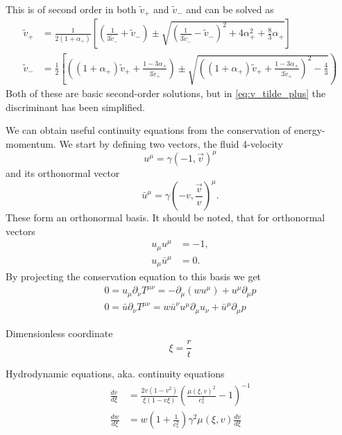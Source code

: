 This is of second order in both $\tilde{v}_+$ and $\tilde{v}_-$ and can be solved as \cite[eq. B.6, B.7]{hindmarsh_gw_pt_2019}
\begin{align}
\tilde{v}_+ &= \frac{1}{2(1+\alpha_+)}\left[ \left(\frac{1}{3\tilde{v}_-}+\tilde{v}_-\right) \pm \sqrt{\left(\frac{1}{3\tilde{v}_-} - \tilde{v}_- \right)^2 + 4\alpha_+^2 + \frac{8}{3} \alpha_+} \right]
\label{eq:v_tilde_plus}
\\
\tilde{v}_- &= \frac{1}{2} \left[ \left( (1+\alpha_+)\tilde{v}_+ + \frac{1-3\alpha_+}{3\tilde{v}_+} \right) \pm \sqrt{\left((1+\alpha_+)\tilde{v}_+ + \frac{1-3\alpha_+}{3\tilde{v}_+} \right)^2 - \frac{4}{3}} \right)
\label{eq:v_tilde_minus}
\end{align}
Both of these are basic second-order solutions, but in \eqref{eq:v_tilde_plus} the discriminant has been simplified.


We can obtain useful continuity equations from the conservation of energy-momentum.
We start by defining two vectors, the fluid 4-velocity
\begin{equation}
u^\mu = \gamma(-1, \overrightarrow{v})^\mu
\end{equation}
and its orthonormal vector
\begin{equation}
\bar{u}^\mu = \gamma(-v, \frac{\overrightarrow{v}}{v})^\mu.
\end{equation}
These form an orthonormal basis.
It should be noted, that for orthonormal vectors
\begin{align}
u_\mu u^\mu &= -1, \\
u_\mu \bar{u}^\mu &= 0.
\end{align}
By projecting the conservation equation to this basis we get
\cite[eq. 7.28-7.29]{lecture_notes}
\begin{align}
0 = u_\mu \partial_\nu T^{\mu \nu} = -\partial_\mu (w u^\mu) + u^\mu \partial_\mu p \\
0 = \bar{u} \partial_\nu T^{\mu \nu} = w \bar{u}^\nu u^\mu \partial_\mu u_\nu + \bar{u}^\mu \partial_\mu p
\end{align}

Dimensionless coordinate
\begin{equation}
\xi = \frac{r}{t}
\end{equation}

Hydrodynamic equations, aka. continuity equations
\cites[eq. 7.30-7.31]{lecture_notes}[eq. 5]{giese_2021}
\begin{align}
\frac{dv}{d\xi} &= \frac{2v(1-v^2)}{\xi(1-v\xi)} \left( \frac{\mu(\xi,v)^2}{c_s^2} - 1 \right)^{-1} \\
\frac{dw}{d\xi} &= w \left( 1 + \frac{1}{c_s^2} \right) \gamma^2 \mu(\xi,v) \frac{dv}{d\xi}
\end{align}

